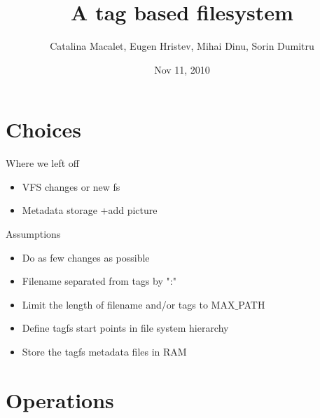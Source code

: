 \documentclass{beamer}
\title[TagFS]{A tag based filesystem}
\author{Catalina Macalet, Eugen Hristev, Mihai Dinu, Sorin Dumitru}
\institute{Politehnic University of Bucharest}
\date{Nov 11, 2010}
\begin{document}
\begin{frame}
  \titlepage
\end{frame}

\section{Choices}

\begin{frame}{Where we left off}
    \begin{itemize}
        \item{VFS changes or new fs}
        \item{Metadata storage}
            +add picture    
    \end{itemize}
\end{frame}

\begin{frame}{Assumptions}
    \begin{itemize}
        \item{Do as few changes as possible}
        \item{Filename separated from tags by ":"}
        \item{Limit the length of filename and/or tags to MAX$\_$PATH}
        \item{Define tagfs start points in file system hierarchy}
        \item{Store the tagfs metadata files in RAM}
    \end{itemize}
\end{frame}

\section{Operations}
\end{document}
